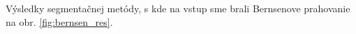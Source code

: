 \documentclass[a4paper,12pt,twoside]{article}%
\begin{document}
Výsledky segmentačnej metódy, s kde na vstup sme brali Bernsenove prahovanie na obr. \ref{fig:bernsen_res}.

\begin{figure}[H]  
    \hspace{5px}

\end{figure}
\end{document}
